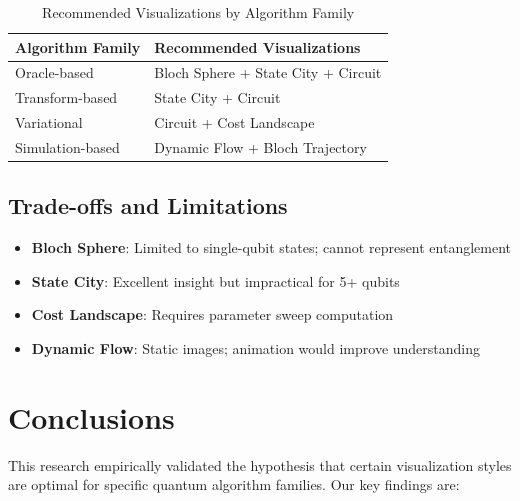 \documentclass[12pt,a4paper]{article}
\begin{document}
\begin{table}[h!]
	\centering
	\caption{Recommended Visualizations by Algorithm Family}
	\label{tab:guidelines}
	\begin{tabular}{@{}ll@{}}
		\toprule
		\textbf{Algorithm Family} & \textbf{Recommended Visualizations} \\ \midrule
		Oracle-based              & Bloch Sphere + State City + Circuit \\
		Transform-based           & State City + Circuit                \\
		Variational               & Circuit + Cost Landscape            \\
		Simulation-based          & Dynamic Flow + Bloch Trajectory     \\ \bottomrule
	\end{tabular}
\end{table}

\subsection{Trade-offs and Limitations}

\begin{itemize}
	\item \textbf{Bloch Sphere}: Limited to single-qubit states; cannot represent entanglement
	\item \textbf{State City}: Excellent insight but impractical for 5+ qubits
	\item \textbf{Cost Landscape}: Requires parameter sweep computation
	\item \textbf{Dynamic Flow}: Static images; animation would improve understanding
\end{itemize}

\newpage

\section{Conclusions}

This research empirically validated the hypothesis that certain visualization styles are optimal for specific quantum algorithm families. Our key findings are:
\end{document}
